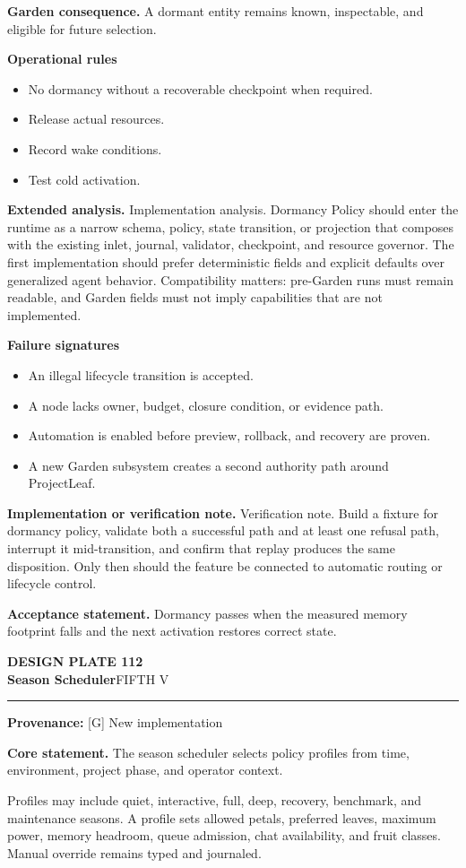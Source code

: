 \documentclass[10pt,letterpaper,oneside]{article}
\newcommand{\prov}[1]{\textcolor{gardenBlue}{\sffamily\footnotesize\textbf{Provenance:} #1}}
\newcommand{\platetitle}[3]{%
  \begin{minipage}[t][0.54in][t]{\textwidth}
  {\sffamily\bfseries\color{gardenDeep}\fontsize{9}{10}\selectfont DESIGN PLATE #1}\\[-1pt]
  {\sffamily\bfseries\color{gardenInk}\fontsize{16.5}{18}\selectfont #2}\hfill{\sffamily\color{gardenGreen}\large #3}
  \end{minipage}\vspace{-2pt}\hrule\vspace{5pt}}
\begin{document}
\textbf{Garden consequence.} A dormant entity remains known, inspectable, and eligible for future selection.

\textbf{Operational rules}
\begin{itemize}
\item No dormancy without a recoverable checkpoint when required.
\item Release actual resources.
\item Record wake conditions.
\item Test cold activation.
\end{itemize}
\textbf{Extended analysis.} Implementation analysis. Dormancy Policy should enter the runtime as a narrow schema, policy, state transition, or projection that composes with the existing inlet, journal, validator, checkpoint, and resource governor. The first implementation should prefer deterministic fields and explicit defaults over generalized agent behavior. Compatibility matters: pre-Garden runs must remain readable, and Garden fields must not imply capabilities that are not implemented.

\textbf{Failure signatures}
\begin{itemize}
\item An illegal lifecycle transition is accepted.
\item A node lacks owner, budget, closure condition, or evidence path.
\item Automation is enabled before preview, rollback, and recovery are proven.
\item A new Garden subsystem creates a second authority path around ProjectLeaf.
\end{itemize}
\textbf{Implementation or verification note.} Verification note. Build a fixture for dormancy policy, validate both a successful path and at least one refusal path, interrupt it mid-transition, and confirm that replay produces the same disposition. Only then should the feature be connected to automatic routing or lifecycle control.

\begin{acceptbox}
\textbf{Acceptance statement.} Dormancy passes when the measured memory footprint falls and the next activation restores correct state.
\end{acceptbox}
\newpage
\platetitle{112}{Season Scheduler}{FIFTH V}
\prov{[G] New implementation}
\fontsize{8.85}{10.45}\selectfont
\begin{corebox}
\textbf{Core statement.} The season scheduler selects policy profiles from time, environment, project phase, and operator context.
\end{corebox}
Profiles may include quiet, interactive, full, deep, recovery, benchmark, and maintenance seasons. A profile sets allowed petals, preferred leaves, maximum power, memory headroom, queue admission, chat availability, and fruit classes. Manual override remains typed and journaled.
\end{document}
